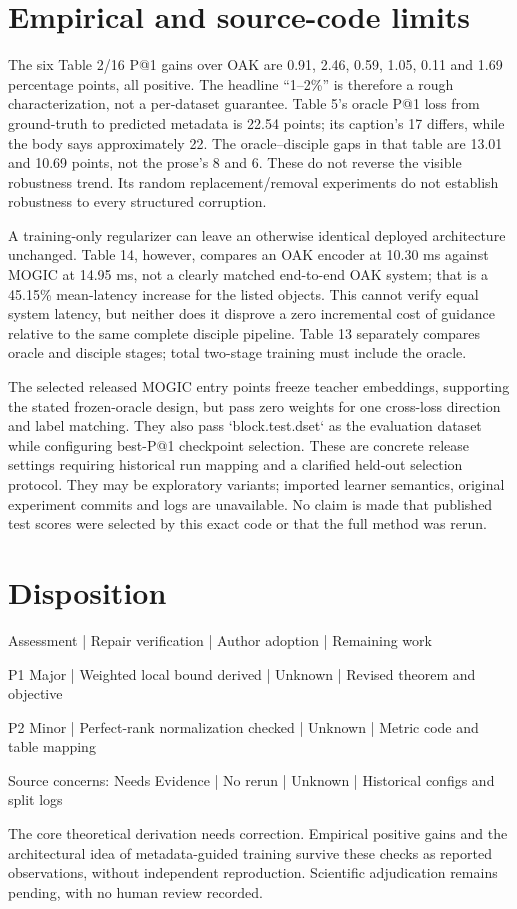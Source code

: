 \documentclass[10pt]{article}
\begin{document}
\section*{Empirical and source-code limits}
The six Table 2/16 P@1 gains over OAK are 0.91, 2.46, 0.59, 1.05, 0.11 and 1.69 percentage points, all positive. The headline “1–2\%” is therefore a rough characterization, not a per-dataset guarantee. Table 5’s oracle P@1 loss from ground-truth to predicted metadata is 22.54 points; its caption’s 17 differs, while the body says approximately 22. The oracle–disciple gaps in that table are 13.01 and 10.69 points, not the prose’s 8 and 6. These do not reverse the visible robustness trend. Its random replacement/removal experiments do not establish robustness to every structured corruption.\par
A training-only regularizer can leave an otherwise identical deployed architecture unchanged. Table 14, however, compares an OAK encoder at 10.30 ms against MOGIC at 14.95 ms, not a clearly matched end-to-end OAK system; that is a 45.15\% mean-latency increase for the listed objects. This cannot verify equal system latency, but neither does it disprove a zero incremental cost of guidance relative to the same complete disciple pipeline. Table 13 separately compares oracle and disciple stages; total two-stage training must include the oracle.\par
The selected released MOGIC entry points freeze teacher embeddings, supporting the stated frozen-oracle design, but pass zero weights for one cross-loss direction and label matching. They also pass `block.test.dset` as the evaluation dataset while configuring best-P@1 checkpoint selection. These are concrete release settings requiring historical run mapping and a clarified held-out selection protocol. They may be exploratory variants; imported learner semantics, original experiment commits and logs are unavailable. No claim is made that published test scores were selected by this exact code or that the full method was rerun.\par
\section*{Disposition}
Assessment | Repair verification | Author adoption | Remaining work\par
P1 Major | Weighted local bound derived | Unknown | Revised theorem and objective\par
P2 Minor | Perfect-rank normalization checked | Unknown | Metric code and table mapping\par
Source concerns: Needs Evidence | No rerun | Unknown | Historical configs and split logs\par
The core theoretical derivation needs correction. Empirical positive gains and the architectural idea of metadata-guided training survive these checks as reported observations, without independent reproduction. Scientific adjudication remains pending, with no human review recorded.\par
\end{document}
